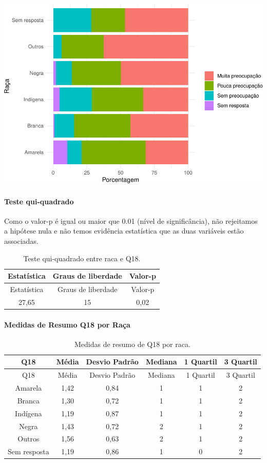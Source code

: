 \documentclass[]{article}
\let\oldparagraph\paragraph
\renewcommand{\paragraph}[1]{\oldparagraph{#1}\mbox{}}
\begin{document}
\begin{center}\includegraphics[width=0.75\linewidth]{relatorio_covid19_files/figure-latex/unnamed-chunk-279-1} \end{center}

\hypertarget{teste-qui-quadrado-25}{%
\paragraph{Teste qui-quadrado}\label{teste-qui-quadrado-25}}

Como o valor-p é igual ou maior que 0.01 (nível de significância), não rejeitamos a hipótese nula e não temos evidência estatística que as duas variáveis estão associadas.

\begin{longtable}[]{@{}ccc@{}}
\caption{\label{tab:unnamed-chunk-281}Teste qui-quadrado entre raca e Q18.}\tabularnewline
\toprule
Estatística & Graus de liberdade & Valor-p\tabularnewline
\midrule
\endfirsthead
\toprule
Estatística & Graus de liberdade & Valor-p\tabularnewline
\midrule
\endhead
27,65 & 15 & 0,02\tabularnewline
\bottomrule
\end{longtable}

\cleardoublepage

\hypertarget{medidas-de-resumo-q18-por-rauxe7a}{%
\paragraph{Medidas de Resumo Q18 por Raça}\label{medidas-de-resumo-q18-por-rauxe7a}}

\begin{longtable}[]{@{}cccccc@{}}
\caption{\label{tab:unnamed-chunk-282}Medidas de resumo de Q18 por raca.}\tabularnewline
\toprule
Q18 & Média & Desvio Padrão & Mediana & 1 Quartil & 3 Quartil\tabularnewline
\midrule
\endfirsthead
\toprule
Q18 & Média & Desvio Padrão & Mediana & 1 Quartil & 3 Quartil\tabularnewline
\midrule
\endhead
Amarela & 1,42 & 0,84 & 1 & 1 & 2\tabularnewline
Branca & 1,30 & 0,72 & 1 & 1 & 2\tabularnewline
Indígena & 1,19 & 0,87 & 1 & 1 & 2\tabularnewline
Negra & 1,43 & 0,72 & 2 & 1 & 2\tabularnewline
Outros & 1,56 & 0,63 & 2 & 1 & 2\tabularnewline
Sem resposta & 1,19 & 0,86 & 1 & 0 & 2\tabularnewline
\bottomrule
\end{longtable}
\end{document}
